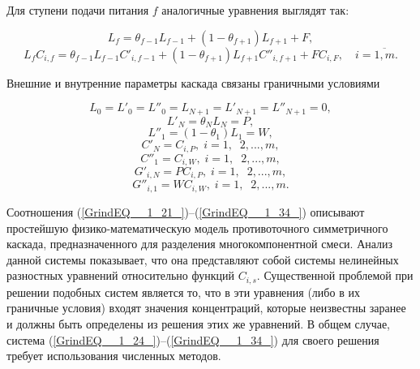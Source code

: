 Для ступени подачи питания $f$ аналогичные уравнения выглядят так:

\begin{equation} \label{GrindEQ__1_26_} 
  L_{f} =\theta _{f-1} L_{f-1} +(1-\theta _{f+1} )L_{f+1} +F, 
  \end{equation} 
  \begin{equation} \label{GrindEQ__1_27_} 
  L_{f} C_{i,f} =\theta _{f-1} L_{f-1} C'_{i,f-1} +(1-\theta _{f+1} )L_{f+1} C''_{i,f+1} +FC_{i,F} ,\quad i=\overline{1,m}.            
\end{equation}

Внешние и внутренние параметры каскада связаны граничными условиями

\begin{equation} \label{GrindEQ__1_28_} 
  L_{0} =L'_{0} =L''_{0} =L_{N+1} =L'_{N+1} =L''_{N+1} =0, 
  \end{equation} 
  \begin{equation} \label{GrindEQ__1_29_} 
  L'_{N} =\theta _{N} L_{N} =P,        
  \end{equation} 
  \begin{equation} \label{GrindEQ__1_30_} 
  L''_{1} =(1-\theta _{1} )L_{1} =W,        
  \end{equation} 
  \begin{equation} \label{GrindEQ__1_31_} 
  C'_{N} =C_{i,P} ,\; i=1,\; \; 2,...,m, 
  \end{equation} 
  \begin{equation} \label{GrindEQ__1_32_} 
  C''_{1} =C_{i,W} ,\; i=1,\; \; 2,...,m, 
  \end{equation} 
  \begin{equation} \label{GrindEQ__1_33_} 
  G'_{i,N} =PC_{i,P} ,\; i=1,\; \; 2,...,m, 
  \end{equation} 
  \begin{equation} \label{GrindEQ__1_34_} 
  G''_{i,1} =WC_{i,W} ,\; i=1,\; \; 2,...,m. 
\end{equation} 

Соотношения (\ref{GrindEQ__1_21_})--(\ref{GrindEQ__1_34_}) описывают простейшую физико-математическую модель противоточного симметричного каскада, предназначенного для разделения многокомпонентной смеси. Анализ данной системы показывает, что она представляют собой системы нелинейных разностных уравнений относительно функций $C_{i,s}$. Существенной проблемой при решении подобных систем является то, что в эти уравнения (либо в их граничные условия) входят значения концентраций, которые неизвестны заранее и должны быть определены из решения этих же уравнений. В общем случае, система (\ref{GrindEQ__1_24_})--(\ref{GrindEQ__1_34_}) для своего решения требует использования численных методов.

